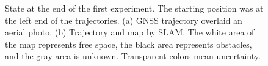 \begin{figure}[h!]
    \centering
	\caption[State at the end of the first experiment.]{State at the end of the first experiment. The starting position was at the left end of the trajectories. (a) GNSS trajectory overlaid an aerial photo. (b) Trajectory and map by SLAM. The white area of the map represents free space, the black area represents obstacles, and the gray area is unknown. Transparent colors mean uncertainty.}
	\label{fig:res2_trajectory}
\end{figure} 

